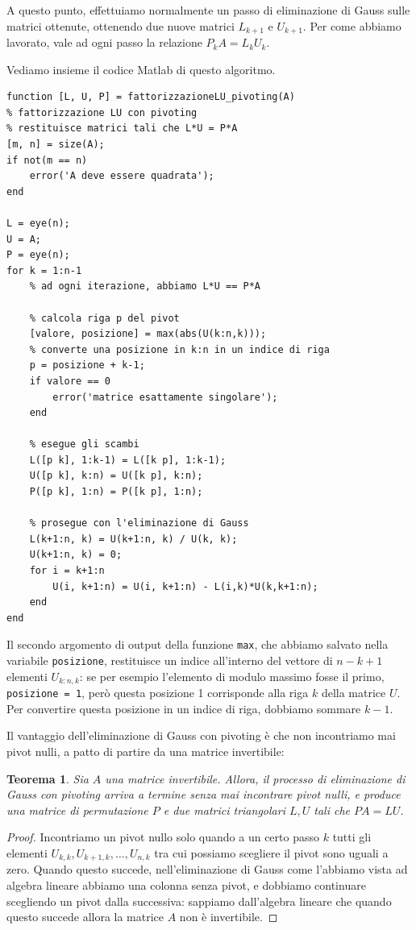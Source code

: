 \documentclass[a4paper]{report}
\newtheorem{theorem}{Teorema}[chapter]
\theoremstyle{definition}
\theoremstyle{remark}
\begin{document}
A questo punto, effettuiamo normalmente un passo di eliminazione di Gauss sulle matrici ottenute, ottenendo due nuove matrici $L_{k+1}$ e $U_{k+1}$. Per come abbiamo lavorato, vale ad ogni passo la relazione $P_k A = L_k U_k$.

Vediamo insieme il codice Matlab di questo algoritmo.
\begin{lstlisting}
function [L, U, P] = fattorizzazioneLU_pivoting(A)
% fattorizzazione LU con pivoting
% restituisce matrici tali che L*U = P*A
[m, n] = size(A);
if not(m == n)
    error('A deve essere quadrata');
end

L = eye(n);
U = A;
P = eye(n);
for k = 1:n-1
    % ad ogni iterazione, abbiamo L*U == P*A

    % calcola riga p del pivot
    [valore, posizione] = max(abs(U(k:n,k)));
    % converte una posizione in k:n in un indice di riga
    p = posizione + k-1;
    if valore == 0
        error('matrice esattamente singolare');
    end

    % esegue gli scambi
    L([p k], 1:k-1) = L([k p], 1:k-1);
    U([p k], k:n) = U([k p], k:n);
    P([p k], 1:n) = P([k p], 1:n);

    % prosegue con l'eliminazione di Gauss
    L(k+1:n, k) = U(k+1:n, k) / U(k, k);
    U(k+1:n, k) = 0;
    for i = k+1:n
        U(i, k+1:n) = U(i, k+1:n) - L(i,k)*U(k,k+1:n);
    end
end    
\end{lstlisting}
Il secondo argomento di output della funzione \lstinline{max}, che abbiamo salvato nella variabile \lstinline{posizione}, restituisce un indice all'interno del vettore di $n-k+1$ elementi $U_{k:n,k}$: se per esempio l'elemento di modulo massimo fosse il primo, \lstinline{posizione = 1}, però questa posizione 1 corrisponde alla riga $k$ della matrice $U$. Per convertire questa posizione in un indice di riga, dobbiamo sommare $k-1$.

Il vantaggio dell'eliminazione di Gauss con pivoting è che non incontriamo mai pivot nulli, a patto di partire da una matrice invertibile:
\begin{theorem}
    Sia $A$ una matrice invertibile. Allora, il processo di eliminazione di Gauss con pivoting arriva a termine senza mai incontrare pivot nulli, e produce una matrice di permutazione $P$ e due matrici triangolari $L,U$ tali che $PA=LU$.
\end{theorem}
\begin{proof}
    Incontriamo un pivot nullo solo quando a un certo passo $k$ tutti gli elementi $U_{k,k}, U_{k+1,k}, \dots, U_{n,k}$ tra cui possiamo scegliere il pivot sono uguali a zero. Quando questo succede, nell'eliminazione di Gauss come l'abbiamo vista ad algebra lineare abbiamo una colonna senza pivot, e dobbiamo continuare scegliendo un pivot dalla successiva: sappiamo dall'algebra lineare che quando questo succede allora la matrice $A$ non è invertibile.
\end{proof}
\end{document}
